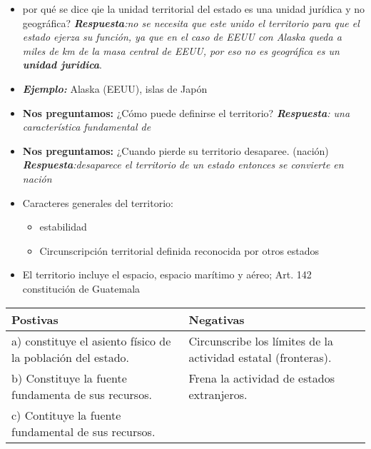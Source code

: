 \begin{itemize}
\begin{enumerate}
\begin{itemize}
            \item por qué se dice qie la unidad territorial del estado es una unidad jurídica y no geográfica? \emph{\textbf{Respuesta}:no se necesita que este unido el territorio para que el estado ejerza su función, ya que en el caso de EEUU con Alaska queda a miles de km de la masa central de EEUU, por eso no es geográfica es un \textbf{unidad juridica}}.
            \item \textbf{\emph{Ejemplo:}} Alaska (EEUU), islas de Japón
        \end{itemize}
        \begin{itemize}
            \item \textbf{Nos preguntamos:} ¿Cómo puede definirse el territorio? \emph{\textbf{Respuesta}: una característica fundamental de }
            \item \textbf{Nos preguntamos:} ¿Cuando pierde su territorio desaparee. (nación) \emph{\textbf{Respuesta}:desaparece el territorio de un estado entonces se convierte en nación}
            \item Caracteres generales del territorio:
            \begin{itemize}
                \item estabilidad
                \item Circunscripción territorial definida reconocida por otros estados
            \end{itemize}
            \item El territorio incluye el espacio, espacio marítimo y aéreo; Art. 142 constitución de Guatemala
        \end{itemize}

        \begin{center}
        \begin{tabular}{| p{5cm} | p{5cm} |}
         \hline
        \textbf{Postivas} & \textbf{Negativas} \\
        \hline
        a) constituye el asiento físico de la población del estado. & Circunscribe los límites de la actividad estatal (fronteras). \\
        b) Constituye la fuente fundamenta de sus recursos.& Frena la actividad de estados extranjeros. \\
        c) Contituye la fuente fundamental de sus recursos. & \\
         \hline
        \end{tabular}
        \end{center}


\end{enumerate}
\end{itemize}
